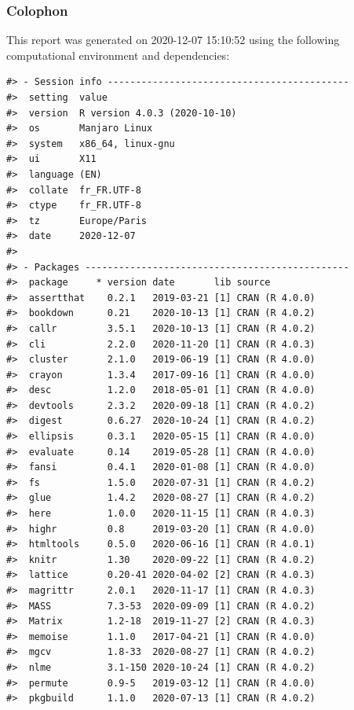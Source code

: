 \documentclass[]{elsarticle} %
\begin{document}
\newpage

\hypertarget{colophon}{%
\subsubsection{Colophon}\label{colophon}}

This report was generated on 2020-12-07 15:10:52 using the following computational environment and dependencies:

\begin{verbatim}
#> - Session info -------------------------------------------
#>  setting  value                       
#>  version  R version 4.0.3 (2020-10-10)
#>  os       Manjaro Linux               
#>  system   x86_64, linux-gnu           
#>  ui       X11                         
#>  language (EN)                        
#>  collate  fr_FR.UTF-8                 
#>  ctype    fr_FR.UTF-8                 
#>  tz       Europe/Paris                
#>  date     2020-12-07                  
#> 
#> - Packages -----------------------------------------------
#>  package     * version date       lib source        
#>  assertthat    0.2.1   2019-03-21 [1] CRAN (R 4.0.0)
#>  bookdown      0.21    2020-10-13 [1] CRAN (R 4.0.2)
#>  callr         3.5.1   2020-10-13 [1] CRAN (R 4.0.2)
#>  cli           2.2.0   2020-11-20 [1] CRAN (R 4.0.3)
#>  cluster       2.1.0   2019-06-19 [1] CRAN (R 4.0.0)
#>  crayon        1.3.4   2017-09-16 [1] CRAN (R 4.0.0)
#>  desc          1.2.0   2018-05-01 [1] CRAN (R 4.0.0)
#>  devtools      2.3.2   2020-09-18 [1] CRAN (R 4.0.2)
#>  digest        0.6.27  2020-10-24 [1] CRAN (R 4.0.2)
#>  ellipsis      0.3.1   2020-05-15 [1] CRAN (R 4.0.0)
#>  evaluate      0.14    2019-05-28 [1] CRAN (R 4.0.0)
#>  fansi         0.4.1   2020-01-08 [1] CRAN (R 4.0.0)
#>  fs            1.5.0   2020-07-31 [1] CRAN (R 4.0.2)
#>  glue          1.4.2   2020-08-27 [1] CRAN (R 4.0.2)
#>  here          1.0.0   2020-11-15 [1] CRAN (R 4.0.3)
#>  highr         0.8     2019-03-20 [1] CRAN (R 4.0.0)
#>  htmltools     0.5.0   2020-06-16 [1] CRAN (R 4.0.1)
#>  knitr         1.30    2020-09-22 [1] CRAN (R 4.0.2)
#>  lattice       0.20-41 2020-04-02 [2] CRAN (R 4.0.3)
#>  magrittr      2.0.1   2020-11-17 [1] CRAN (R 4.0.3)
#>  MASS          7.3-53  2020-09-09 [1] CRAN (R 4.0.2)
#>  Matrix        1.2-18  2019-11-27 [2] CRAN (R 4.0.3)
#>  memoise       1.1.0   2017-04-21 [1] CRAN (R 4.0.0)
#>  mgcv          1.8-33  2020-08-27 [1] CRAN (R 4.0.2)
#>  nlme          3.1-150 2020-10-24 [1] CRAN (R 4.0.2)
#>  permute       0.9-5   2019-03-12 [1] CRAN (R 4.0.0)
#>  pkgbuild      1.1.0   2020-07-13 [1] CRAN (R 4.0.2)

\end{verbatim}
\end{document}
